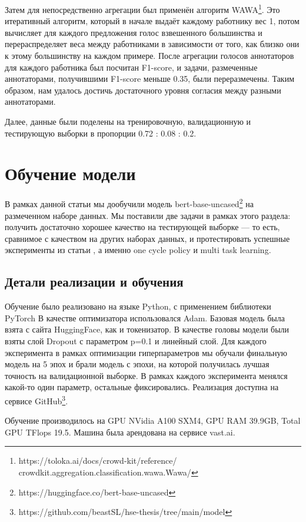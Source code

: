 \documentclass[conference]{IEEEtran}
\begin{document}
Затем для непосредственно агрегации был применён алгоритм WAWA\footnote{https://toloka.ai/docs/crowd-kit/reference/\\crowdkit.aggregation.classification.wawa.Wawa/}. Это итеративный алгоритм, который в начале выдаёт каждому работнику вес 1, потом вычисляет для каждого предложения голос взвешенного большинства и перераспределяет веса между работниками в зависимости от того, как близко они к этому большинству на каждом примере. После агрегации голосов аннотаторов для каждого работника был посчитан F1-score, и задачи, размеченные аннотаторами, получившими F1-score меньше 0.35, были переразмечены. Таким образом, нам удалось достичь достаточного уровня согласия между разными аннотаторами.

Далее, данные были поделены на тренировочную, валидационную и тестирующую выборки в пропорции 0.72 : 0.08 : 0.2.

\section{Обучение модели}
В рамках данной статьи мы дообучили модель bert-base-uncased\footnote{https://huggingface.co/bert-base-uncased} на размеченном наборе данных. Мы поставили две задачи в рамках этого раздела: получить достаточно хорошее качество на тестирующей выборке --- то есть, сравнимое с качеством на других наборах данных, и протестировать успешные эксперименты из статьи \cite{bert-finetune}, а именно one cycle policy и multi task learning.

\subsection{Детали реализации и обучения}
Обучение было реализовано на языке Python, с применением библиотеки PyTorch В качестве оптимизатора использовался Adam. Базовая модель была взята с сайта HuggingFace, как и токенизатор. В качестве головы модели были взяты слой Dropout с параметром p=0.1 и линейный слой. Для каждого эксперимента в рамках оптимизации гиперпараметров мы обучали финальную модель на 5 эпох и брали модель с эпохи, на которой получилась лучшая точность на валидационной выборке. В рамках каждого эксперимента менялся какой-то один параметр, остальные фиксировались. Реализация доступна на сервисе GitHub\footnote{https://github.com/beastSL/hse-thesis/tree/main/model}.

Обучение производилось на GPU NVidia A100 SXM4, GPU RAM 39.9GB, Total GPU TFlops 19.5. Машина была арендована на сервисе vast.ai.
\end{document}
